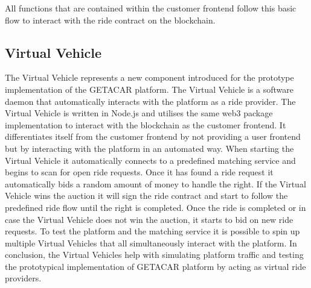 All functions that are contained within the customer frontend follow this basic flow to interact with the ride contract on the blockchain.


\subsection{Virtual Vehicle}
The Virtual Vehicle represents a new component introduced for the prototype implementation of the GETACAR platform. The Virtual Vehicle is a software daemon that automatically interacts with the platform as a ride provider. The Virtual Vehicle is written in Node.js and utilises the same web3 package implementation to interact with the blockchain as the customer frontend. It differentiates itself from the customer frontend by not providing a user frontend but by interacting with the platform in an automated way. When starting the Virtual Vehicle it automatically connects to a predefined matching service and begins to scan for open ride requests. Once it has found a ride request it automatically bids a random amount of money to handle the right. If the Virtual Vehicle wins the auction it will sign the ride contract and start to follow the predefined ride flow until the right is completed. Once the ride is completed or in case the Virtual Vehicle does not win the auction, it starts to bid on new ride requests. To test the platform and the matching service it is possible to spin up multiple Virtual Vehicles that all simultaneously interact with the platform. 
In conclusion, the Virtual Vehicles help with simulating platform traffic and testing the prototypical implementation of GETACAR platform by acting as virtual ride providers. 